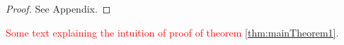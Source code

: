 \begin{proof}See Appendix.
\end{proof}

\textcolor{red}{Some text explaining the intuition of proof of theorem \ref{thm:mainTheorem1}.}
%
%
